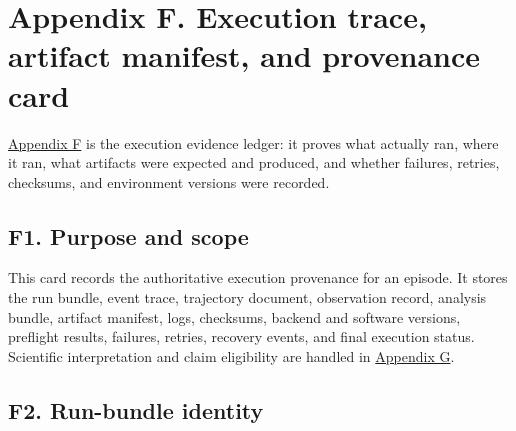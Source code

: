 \section{\texorpdfstring{\textbf{Appendix F. Execution trace, artifact manifest, and provenance card}}{Appendix F. Execution trace, artifact manifest, and provenance card}}\label{appendix-f.-execution-trace-artifact-manifest-and-provenance-card}\label{app:f}

\hyperref[app:f]{Appendix F} is the execution evidence ledger: it proves what actually ran, where it ran, what artifacts were expected and produced, and whether failures, retries, checksums, and environment versions were recorded.

\subsection{\texorpdfstring{\textbf{F1. Purpose and scope}}{F1. Purpose and scope}}\label{f1.-purpose-and-scope}

This card records the authoritative execution provenance for an episode. It stores the run bundle, event trace, trajectory document, observation record, analysis bundle, artifact manifest, logs, checksums, backend and software versions, preflight results, failures, retries, recovery events, and final execution status. Scientific interpretation and claim eligibility are handled in \hyperref[app:g]{Appendix G}.

\subsection{\texorpdfstring{\textbf{F2. Run-bundle identity}}{F2. Run-bundle identity}}\label{f2.-run-bundle-identity}

